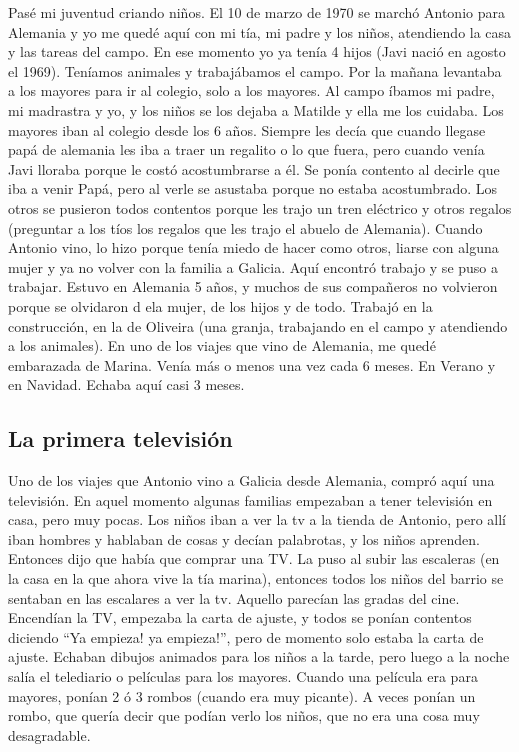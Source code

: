\documentclass[12pt,a5paper]{book}
\begin{document}
Pasé mi juventud criando niños. El 10 de marzo de 1970 se marchó Antonio para Alemania y yo me quedé aquí con mi tía, mi padre y los niños, atendiendo la casa y las tareas del campo. En ese momento yo ya tenía 4 hijos (Javi nació en agosto el 1969).
Teníamos animales y trabajábamos el campo. Por la mañana levantaba a los mayores para ir al colegio, solo a los mayores. Al campo íbamos mi padre, mi madrastra y yo, y los niños se los dejaba a Matilde y ella me los cuidaba. Los mayores iban al colegio desde los 6 años.
Siempre les decía que cuando llegase papá de alemania les iba a traer un regalito o lo que fuera, pero cuando venía Javi lloraba porque le costó acostumbrarse a él. Se ponía contento al decirle que iba a venir Papá, pero al verle se asustaba porque no estaba acostumbrado. Los otros se pusieron todos contentos porque les trajo un tren eléctrico y otros regalos (preguntar a los tíos los regalos que les trajo el abuelo de Alemania). 
Cuando Antonio vino, lo hizo porque tenía miedo de hacer como otros, liarse con alguna mujer y ya no volver con la familia a Galicia. Aquí encontró trabajo y se puso a trabajar. Estuvo en Alemania 5 años, y muchos de sus compañeros no volvieron porque se olvidaron d ela mujer, de los hijos y de todo.
Trabajó en la construcción, en la de Oliveira (una granja, trabajando en el campo y atendiendo a los animales).
En uno de los viajes que vino de Alemania, me quedé embarazada de Marina.
Venía más o menos una vez cada 6 meses. En Verano y en Navidad. Echaba aquí casi 3 meses.


\subsection*{La primera televisión}

Uno de los viajes que Antonio vino a Galicia desde Alemania, compró aquí una televisión. En aquel momento algunas familias empezaban a tener televisión en casa, pero muy pocas.
Los niños iban a ver la tv a la tienda de Antonio, pero allí iban hombres y hablaban de cosas y decían palabrotas, y los niños aprenden. Entonces dijo que había que comprar una TV. La puso al subir las escaleras (en la casa en la que ahora vive la tía marina), entonces todos los niños del barrio  se sentaban en las escalares a ver la tv. Aquello parecían las gradas del cine. 
Encendían la TV, empezaba la carta de ajuste, y todos se ponían contentos diciendo “Ya empieza! ya empieza!”, pero de momento solo estaba la carta de ajuste. Echaban dibujos animados para los niños a la tarde, pero luego a la noche salía el telediario o películas para los mayores.
Cuando una película era para mayores, ponían 2 ó 3 rombos (cuando era muy picante). A veces ponían un rombo, que quería decir que podían verlo los niños, que no era una cosa muy desagradable.
\end{document}
